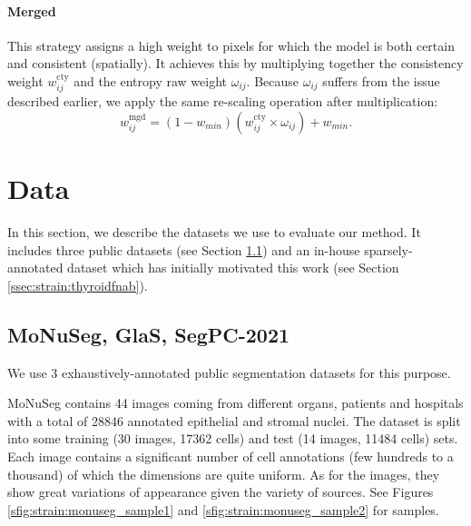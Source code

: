 
\paragraph{Merged} This strategy assigns a high weight to pixels for which the model is both certain and consistent (spatially). It achieves this by multiplying together the consistency weight $w^{\text{cty}}_{ij}$ and the entropy raw weight $\omega_{ij}$. Because $\omega_{ij}$ suffers from the issue described earlier, we apply the same re-scaling operation after multiplication:
\begin{equation}
w^{\text{mgd}}_{ij} = (1 - w_{min}) \left(w^{\text{cty}}_{ij} \times \omega_{ij}\right) + w_{min}.
\end{equation}


\section{Data}
\label{sec:strain:data}
In this section, we describe the datasets we use to evaluate our method. It includes three public datasets (see Section \ref{ssec:strain:datapublicdatasets}) and an in-house sparsely-annotated dataset which has initially motivated this work (see Section \ref{ssec:strain:thyroidfnab}). 

\subsection{MoNuSeg, GlaS, SegPC-2021}
\label{ssec:strain:datapublicdatasets}
We use 3 exhaustively-annotated public segmentation datasets for this purpose.

MoNuSeg \parencite{kumar2019multi} contains 44 images coming from different organs, patients and hospitals with a total of 28846 annotated epithelial and stromal nuclei. The dataset is split into some training (30 images, 17362 cells) and test (14 images, 11484 cells) sets. Each image contains a significant number of cell annotations (few hundreds to a thousand) of which the dimensions are quite uniform. As for the images, they show great variations of appearance given the variety of sources. See Figures \ref{sfig:strain:monuseg_sample1} and 
\ref{sfig:strain:monuseg_sample2} for samples.

